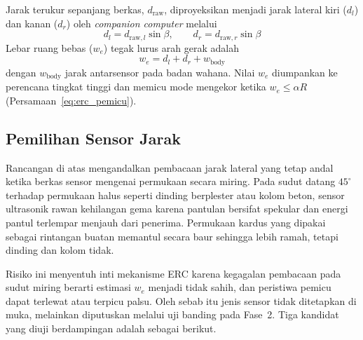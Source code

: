 \documentclass[12pt,a4paper]{report}
\begin{document}
Jarak terukur sepanjang berkas, $d_{\mathrm{raw}}$, diproyeksikan menjadi jarak lateral kiri ($d_l$\label{sym:dl}) dan kanan ($d_r$\label{sym:dr}) oleh \textit{companion computer} melalui
\begin{equation}
    d_l = d_{\mathrm{raw},l}\sin\beta, \qquad d_r = d_{\mathrm{raw},r}\sin\beta
\end{equation}
Lebar ruang bebas ($w_e$\label{sym:we}) tegak lurus arah gerak adalah
\begin{equation}
    w_e = d_l + d_r + w_{\text{body}}
\end{equation}
dengan $w_{\text{body}}$\label{sym:wbody} jarak antarsensor pada badan wahana. Nilai $w_e$ diumpankan ke perencana tingkat tinggi dan memicu mode mengekor ketika $w_e \le \alpha R$ (Persamaan~\ref{eq:erc_pemicu}).

\subsection{Pemilihan Sensor Jarak}
\label{subsec:pemilihan_sensor}

Rancangan di atas mengandalkan pembacaan jarak lateral yang tetap andal ketika berkas sensor mengenai permukaan secara miring. Pada sudut datang $45^\circ$ terhadap permukaan halus seperti dinding berplester atau kolom beton, sensor ultrasonik rawan kehilangan gema karena pantulan bersifat spekular dan energi pantul terlempar menjauh dari penerima. Permukaan kardus yang dipakai sebagai rintangan buatan memantul secara baur sehingga lebih ramah, tetapi dinding dan kolom tidak.

Risiko ini menyentuh inti mekanisme ERC karena kegagalan pembacaan pada sudut miring berarti estimasi $w_e$ menjadi tidak sahih, dan peristiwa pemicu dapat terlewat atau terpicu palsu. Oleh sebab itu jenis sensor tidak ditetapkan di muka, melainkan diputuskan melalui uji banding pada Fase~2. Tiga kandidat yang diuji berdampingan adalah sebagai berikut.
\end{document}
